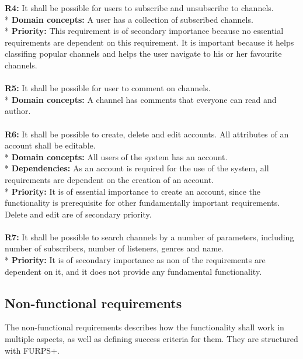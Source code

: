 \documentclass[a4paper,11pt,report]{article}
\begin{document}
{\textbf{R4:}
It shall be possible for users to subscribe and unsubscribe to channels. \\*
\textbf{Domain concepts:}
A user has a collection of subscribed channels. \\*
\textbf{Priority:}
This requirement is of secondary importance because no essential requirements are dependent on this requirement. It is important because it helps classifing popular channels and helps the user navigate to his or her favourite channels.
\\ \\

\textbf{R5:}
It shall be possible for user to comment on channels. \\*
\textbf{Domain concepts:}
A channel has comments that everyone can read and author.
\\ \\

\textbf{R6:}
It shall be possible to create, delete and edit accounts. All attributes of an account shall be editable. \\*
\textbf{Domain concepts:}
All users of the system has an account. \\*
\textbf{Dependencies:}
As an account is required for the use of the system, all requirements are dependent on the creation of an account. \\*
\textbf{Priority:} 
It is of essential importance to create an account, since the functionality is prerequisite for other fundamentally important requirements. Delete and edit are of secondary priority.
\\ \\

\textbf{R7:}
It shall be possible to search channels by a number of parameters, including number of subscribers, number of listeners, genres and name. \\*
\textbf{Priority:} 
It is of secondary importance as non of the requirements are dependent on it, and it does not provide any fundamental functionality.

\subsection{Non-functional requirements}
The non-functional requirements describes how the functionality shall work in multiple aspects, as well as defining success criteria for them. They are structured with FURPS+. \\

}
\end{document}

